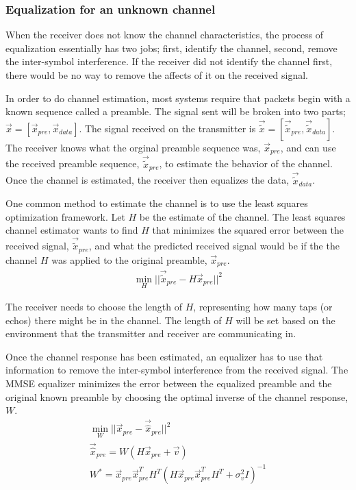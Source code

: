 \subsubsection{Equalization for an unknown channel}
When the receiver does not know the channel characteristics, the process of equalization essentially has two jobs; first, identify the channel, second, remove the inter-symbol interference. If the receiver did not identify the channel first, there would be no way to remove the affects of it on the received signal. 

In order to do channel estimation, most systems require that packets begin with a known sequence called a preamble. The signal sent will be broken into two parts; $\vec{x} = [\vec{x}_{pre}, \vec{x}_{data}]$.  The signal received on the transmitter is $\vec{\tilde{x}}=[\vec{\tilde{x}}_{pre},\vec{\tilde{x}}_{data}]$.  
The receiver knows what the orginal preamble sequence was, $\vec{x}_{pre}$, and can use the received preamble sequence, $\vec{\tilde{x}}_{pre}$, to estimate the behavior of the channel.
Once the channel is estimated, the receiver then equalizes the data, $\vec{\tilde{x}}_{data}$.

One common method to estimate the channel is to use the least squares optimization framework. Let $H$ be the estimate of the channel.  The least squares channel estimator wants to find $H$ that minimizes the squared error between the received signal, $\vec{\tilde{x}}_{pre}$, and what the predicted received signal would be if the the channel $H$ was applied to the original preamble, $\vec{x}_{pre}$.
\begin{align}
\min_H ||\vec{\tilde{x}}_{pre}-H\vec{x}_{pre}||^2
\end{align}

The receiver needs to choose the length of $H$, representing how many taps (or echos) there might be in the channel.  The length of $H$ will be set based on the environment that the transmitter and receiver are communicating in.

Once the channel response has been estimated, an equalizer has to use that information to remove the inter-symbol interference from the received signal.
The MMSE equalizer minimizes the error between the equalized preamble and the original known preamble by choosing the optimal inverse of the channel response, $W$.
\begin{align}
\min_W||\vec{x}_{pre}-\vec{\hat{x}}_{pre}||^2 \\
\vec{\hat{x}}_{pre} = W (H\vec{x}_{pre}+\vec{v}) \\
W^* = \vec{x}_{pre} \vec{x}_{pre}^T H^T (H \vec{x}_{pre} \vec{x}_{pre}^T H^T + \sigma_v^2 I)^{-1}
\end{align}

